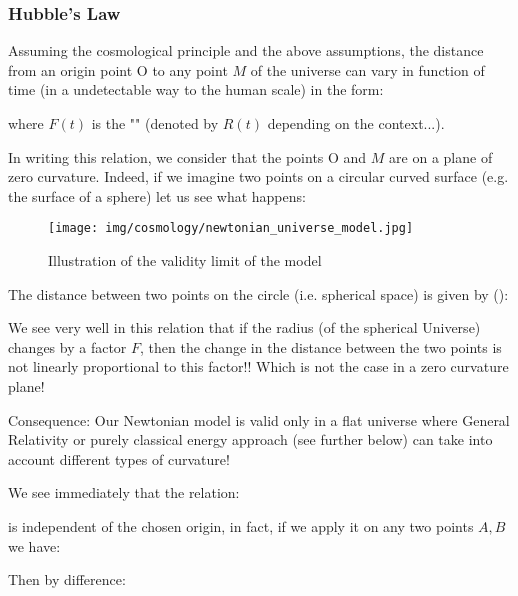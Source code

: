 	\pagebreak
	\subsubsection{Hubble's Law}
	Assuming the cosmological principle and the above assumptions, the distance from an origin point O to any point $M$ of the universe can vary in function of time (in a undetectable way to the human scale) in the form:
	
	where $F(t)$ is the "" (denoted by $R(t)$ depending on the context...).
	
	In writing this relation, we consider that the points O and $M$ are on a plane of zero curvature. Indeed, if we imagine two points on a circular curved surface (e.g. the surface of a sphere) let us see what happens:
	\begin{figure}[H]
		\begin{center}
		\texttt{[image: img/cosmology/newtonian\_universe\_model.jpg]}
		\end{center}	
		\caption{Illustration of the validity limit of the model}
	\end{figure}
	The distance between two points on the circle (i.e. spherical space) is given by ():
	
	We see very well in this relation that if the radius (of the spherical Universe) changes by a factor $F$, then the change in the distance between the two points is not linearly proportional to this factor!! Which is not the case in a zero curvature plane!
	
	Consequence: Our Newtonian model is valid only in a flat universe where General Relativity or purely classical energy approach (see further below) can take into account different types of curvature!
	
	We see immediately that the relation:
	
	is independent of the chosen origin, in fact, if we apply it on any two points $A, B$ we have:
	
	Then by difference:
	
